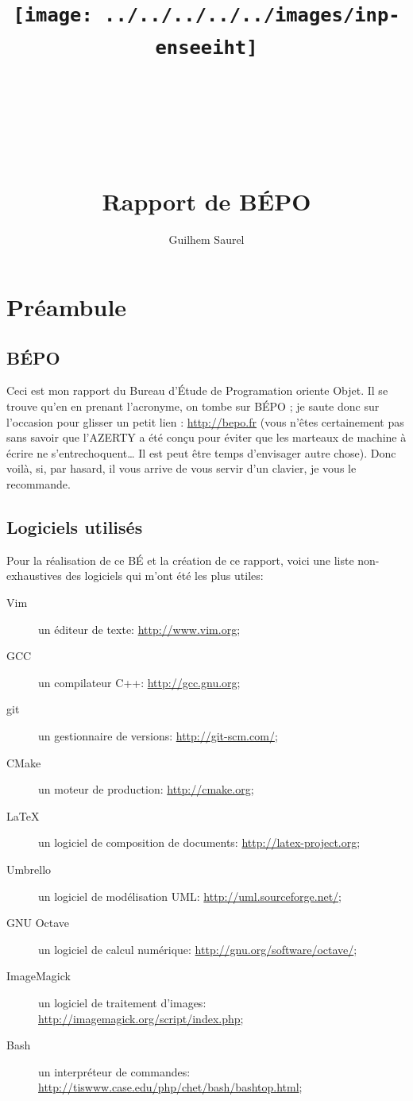 \documentclass{report}
\title{\texttt{[image: ../../../../../images/inp-enseeiht]} \\ ~ \\ ~ \\ ~ \\ ~ \\ Rapport de BÉPO}
\author{Guilhem Saurel}
\date{\oldstylenums{\today}}
\begin{document}
\begin{titlepage}
    \setcounter{page}{0}
    \maketitle
    \thispagestyle{empty}
\end{titlepage}

\tableofcontents
\newpage



\chapter*{Préambule}
\section{BÉPO}
Ceci est mon rapport du Bureau d’Étude de Programation oriente Objet. Il se trouve qu’en en prenant
l’acronyme, on tombe sur BÉPO ; je saute donc sur l’occasion pour glisser un petit lien : \url{http://bepo.fr}
(vous n’êtes certainement pas sans savoir que l’AZERTY a été conçu pour éviter que les marteaux de 
machine à écrire ne s’entrechoquent… Il est peut être temps d’envisager autre chose). Donc voilà, si,
par hasard, il vous arrive de vous servir d’un clavier, je vous le recommande.

\section{Logiciels utilisés}
Pour la réalisation de ce BÉ et la création de ce rapport, voici une liste non-exhaustives des 
logiciels qui m’ont été les plus utiles:
\begin{description}
    \item[Vim] un éditeur de texte: \url{http://www.vim.org};
    \item[GCC] un compilateur C++: \url{http://gcc.gnu.org};
    \item[git] un gestionnaire de versions: \url{http://git-scm.com/};
    \item[CMake] un moteur de production: \url{http://cmake.org};
    \item[\LaTeX] un logiciel de composition de documents: \url{http://latex-project.org};
    \item[Umbrello] un logiciel de modélisation UML: \url{http://uml.sourceforge.net/};
    \item[GNU Octave] un logiciel de calcul numérique: \url{http://gnu.org/software/octave/};
    \item[ImageMagick] un logiciel de traitement d’images: \url{http://imagemagick.org/script/index.php};
    \item[Bash] un interpréteur de commandes: \url{http://tiswww.case.edu/php/chet/bash/bashtop.html};
\end{description}
\end{document}
